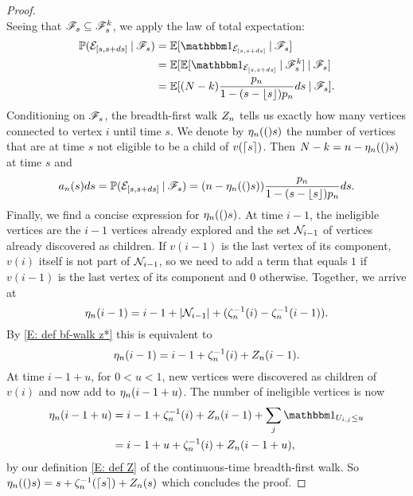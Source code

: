 \begin{proof}
\begin{equation}
	\end{equation}
	Seeing that $\mathscr{F}_s \subseteq \mathscr{F}_s^k$,
	we apply the law of total expectation:
	\begin{equation}
	\begin{aligned}
	\Prob(\NewEdge{[s,s+ds]} \cond \SigmaAlgebra_s)
	&= \Exp{\Ind{\NewEdge{[s,s+ds]}} \cond \SigmaAlgebra_s} \\
	&= \Exp{ \Exp{\Ind{\NewEdge{[s,s+ds]}} \cond \SigmaAlgebra_s^k} \cond \SigmaAlgebra_s} \\
	&= \Exp{ (N-k) \ps ds \cond \SigmaAlgebra_s}.
	\end{aligned}
	\end{equation}
	Conditioning on $\mathscr{F}_s$,
	the breadth-first walk $Z_n$ tells us exactly how many vertices connected to vertex $i$ until time $s$.
	We denote by $\eta_n(()s)$ the number of vertices that are at time $s$ not eligible to be a child of $v(\lceil s\rceil)$.
	Then $N-k=n-\eta_n(()s)$ at time $s$ and
	\begin{equation}
	a_n(s)ds = \mathbb{P}(\mathcal{E}_{[s, s+ds]} \: | \: \mathscr{F}_s) = (n - \eta_n(()s)) \frac{p_n}{1-(s-\lfloor s\rfloor)p_n} ds.
	\end{equation}
	Finally, we find a concise expression for $\eta_n(()s)$.
	At time $i-1$, the ineligible vertices are the $i-1$ vertices already explored
	and the set $\mathcal{N}_{i-1}$ of vertices already discovered as children.
	If $v(i-1)$ is the last vertex of its component,
	$v(i)$ itself is not part of $\mathcal{N}_{i-1}$, 
	so we need to add a term that equals $1$ if $v(i-1)$ is the last vertex of its component and $0$ otherwise.
	Together, we arrive at
	\begin{equation}
	\eta_n(i-1) = i-1 + |\mathcal{N}_{i-1}| + (\zeta^{-1}_n(i) - \zeta^{-1}_n(i-1)).
	\end{equation}
	By \eqref{E: def bf-walk z*} this is equivalent to
	\begin{equation}
	\eta_n(i-1) = i-1 + \zeta^{-1}_n(i) + Z_n(i-1).
	\end{equation}
	At time $i-1+u$, for $0<u<1$, 
	new vertices were discovered as children of $v(i)$ and now add to $\eta_n(i-1+u)$.
	The number of ineligible vertices is now
	\begin{equation}
	\begin{aligned}
	\Ineligible{i-1+u} 
	&= i-1 + \ZetaMinus{i} + \Zn(i-1) + \sum_{j} \Ind{\Uij \leq u} \\
	&= i-1+u + \ZetaMinus{i} + \Zn(i-1+u),
	\end{aligned}
	\end{equation} 
	by our definition \eqref{E: def Z} of the continuous-time breadth-first walk.
	So $\eta_n(()s) = s + \zeta^{-1}_n(\lceil s\rceil) + Z_n(s)$ which concludes the proof.
\end{proof}

